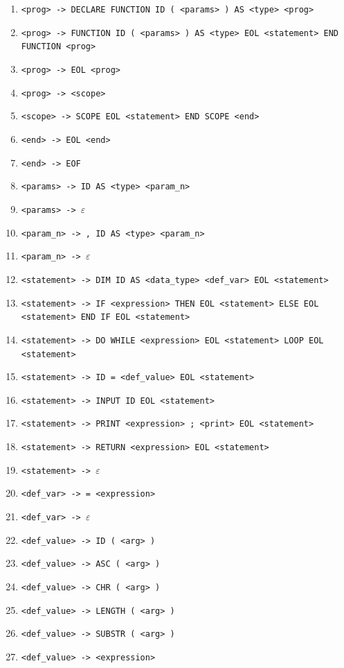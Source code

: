 \documentclass[a4paper, 11pt]{article}
\begin{document}
	\begin{enumerate}[noitemsep]
  		\item \verb|<prog> -> DECLARE FUNCTION ID ( <params> ) AS <type> <prog>|
		\item \verb|<prog> -> FUNCTION ID ( <params> ) AS <type> EOL <statement> END| \newline \verb|FUNCTION <prog>|
		\item \verb|<prog> -> EOL <prog>|
		\item \verb|<prog> -> <scope>|

		\item \verb|<scope> -> SCOPE EOL <statement> END SCOPE <end>|
		\item \verb|<end> -> EOL <end>|
		\item \verb|<end> -> EOF|

		\item \verb|<params> -> ID AS <type> <param_n>|
		\item \verb|<params> -> |$\varepsilon$

		\item \verb|<param_n> -> , ID AS <type> <param_n>|
		\item \verb|<param_n> -> |$\varepsilon$

		\item \verb|<statement> -> DIM ID AS <data_type> <def_var> EOL <statement>|
		\item \verb|<statement> -> IF <expression> THEN EOL <statement> ELSE EOL| \newline \verb|<statement> END IF EOL <statement>|
		\item \verb|<statement> -> DO WHILE <expression> EOL <statement> LOOP EOL| \newline \verb|<statement>|
		\item \verb|<statement> -> ID = <def_value> EOL <statement>|
		\item \verb|<statement> -> INPUT ID EOL <statement>|
		\item \verb|<statement> -> PRINT <expression> ; <print> EOL <statement>|
		\item \verb|<statement> -> RETURN <expression> EOL <statement>|
		\item \verb|<statement> -> |$\varepsilon$

		\item \verb|<def_var> -> = <expression>|
		\item \verb|<def_var> -> |$\varepsilon$

		\item \verb|<def_value> -> ID ( <arg> )|
		\item \verb|<def_value> -> ASC ( <arg> )|
		\item \verb|<def_value> -> CHR ( <arg> )|
		\item \verb|<def_value> -> LENGTH ( <arg> )|
		\item \verb|<def_value> -> SUBSTR ( <arg> )|
		\item \verb|<def_value> -> <expression>|


\end{enumerate}
\end{document}
